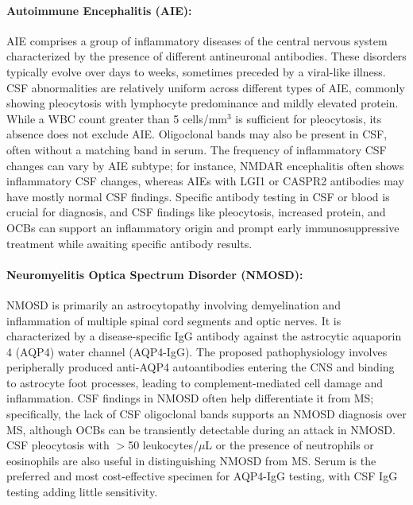	\paragraph{Autoimmune Encephalitis (AIE):} AIE comprises a group of inflammatory diseases of the central nervous system characterized by the presence of different antineuronal antibodies. These disorders typically evolve over days to weeks, sometimes preceded by a viral-like illness. CSF abnormalities are relatively uniform across different types of AIE, commonly showing pleocytosis with lymphocyte predominance and mildly elevated protein. While a WBC count greater than 5 cells/mm$^3$ is sufficient for pleocytosis, its absence does not exclude AIE. Oligoclonal bands may also be present in CSF, often without a matching band in serum. The frequency of inflammatory CSF changes can vary by AIE subtype; for instance, NMDAR encephalitis often shows inflammatory CSF changes, whereas AIEs with LGI1 or CASPR2 antibodies may have mostly normal CSF findings. Specific antibody testing in CSF or blood is crucial for diagnosis, and CSF findings like pleocytosis, increased protein, and OCBs can support an inflammatory origin and prompt early immunosuppressive treatment while awaiting specific antibody results.
	
	\paragraph{Neuromyelitis Optica Spectrum Disorder (NMOSD):} NMOSD is primarily an astrocytopathy involving demyelination and inflammation of multiple spinal cord segments and optic nerves. It is characterized by a disease-specific IgG antibody against the astrocytic aquaporin 4 (AQP4) water channel (AQP4-IgG). The proposed pathophysiology involves peripherally produced anti-AQP4 autoantibodies entering the CNS and binding to astrocyte foot processes, leading to complement-mediated cell damage and inflammation. CSF findings in NMOSD often help differentiate it from MS; specifically, the lack of CSF oligoclonal bands supports an NMOSD diagnosis over MS, although OCBs can be transiently detectable during an attack in NMOSD. CSF pleocytosis with $>$50 leukocytes/$\mu$L or the presence of neutrophils or eosinophils are also useful in distinguishing NMOSD from MS. Serum is the preferred and most cost-effective specimen for AQP4-IgG testing, with CSF IgG testing adding little sensitivity.
	
